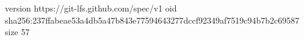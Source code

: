 version https://git-lfs.github.com/spec/v1
oid sha256:237ffabeae53a4db5a47b843e77594643277dccf92349af7519c94b7b2c69587
size 57
